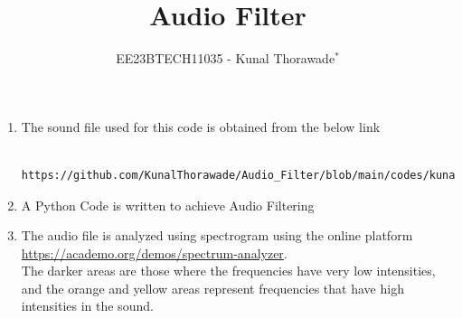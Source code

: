 \documentclass[journal,12pt,twocolumn]{IEEEtran}
\theoremstyle{remark}
\begin{document}

\vspace{3cm}
\title{Audio Filter}
\author{EE23BTECH11035 - Kunal Thorawade$^{*}$%
}
\maketitle
\newpage
\bigskip
\renewcommand{\thefigure}{\arabic{figure}}
\renewcommand{\thetable}{\theenumi}


\begin{enumerate}[label=\thesection.\arabic*
		,ref=\thesection.\theenumi]
		\section{Digital Filter}
		\label{input_sound}
	\item The sound file used for this code is obtained from the below link
		\begin{lstlisting}
		https://github.com/KunalThorawade/Audio_Filter/blob/main/codes/kunal.wav
		\end{lstlisting}
	\item 
		\label{Python code}
		A Python Code is written to achieve Audio Filtering 
		\label{prob:audio_filter_problem}

	\item 
		\label{Visualization}

		The audio file is analyzed using spectrogram using the online platform \href{https://academo.org/demos/spectrum-analyzer}{\url{https://academo.org/demos/spectrum-analyzer}}.\\

		The darker areas are those where the frequencies have very low intensities, and the orange and yellow areas represent frequencies that have high intensities in the sound.



\end{enumerate}
\end{document}
